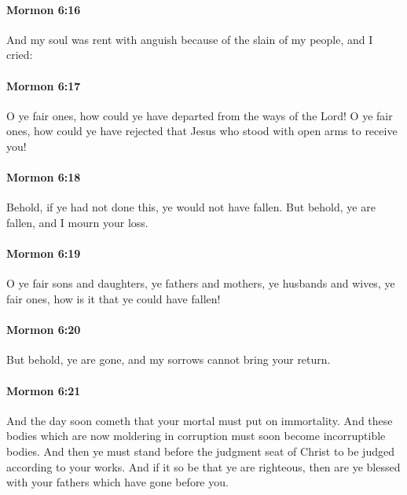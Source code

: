 		\paragraph{Mormon 6:16} %
			\label{MORMON-6-16}

			And my soul was rent with anguish
			because of the slain of my people,
			and I cried:

		\paragraph{Mormon 6:17} %
			\label{MORMON-6-17}

			O ye fair ones,
			how could ye have departed from the ways of the Lord!
			O ye fair ones,
			how could ye have rejected that Jesus
			who stood with open arms to receive you!

		\paragraph{Mormon 6:18} %
			\label{MORMON-6-18}

			Behold, if ye had not done this,
			ye would not have fallen.
			But behold, ye are fallen,
			and I mourn your loss.

		\paragraph{Mormon 6:19} %
			\label{MORMON-6-19}

			O ye fair sons and daughters,
			ye fathers and mothers,
			ye husbands and wives,
			ye fair ones,
			how is it that ye could have fallen!

		\paragraph{Mormon 6:20} %
			\label{MORMON-6-20}

			But behold, ye are gone,
			and my sorrows cannot bring your return.

		\paragraph{Mormon 6:21} %
			\label{MORMON-6-21}

			And the day soon cometh that your mortal must put on immortality.
			And these bodies which are now moldering in corruption
			must soon become incorruptible bodies.
			And then ye must stand before the judgment seat of Christ
			to be judged according to your works.
			And if it so be that ye are righteous,
			then are ye blessed with your fathers which have gone before you.

